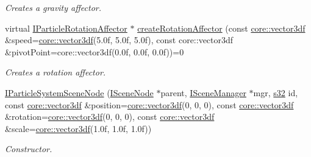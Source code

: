 \begin{DoxyCompactItemize}
\begin{DoxyCompactList}\small\item\em Creates a gravity affector. \end{DoxyCompactList}\item 
virtual \hyperlink{classirr_1_1scene_1_1IParticleRotationAffector}{I\+Particle\+Rotation\+Affector} $\ast$ \hyperlink{classirr_1_1scene_1_1IParticleSystemSceneNode_a7a09b7ebc0d4a2d164233c42689623d6}{create\+Rotation\+Affector} (const \hyperlink{namespaceirr_1_1core_ae6e2b2a6c552833ebbd5b7463d03586b}{core\+::vector3df} \&speed=\hyperlink{namespaceirr_1_1core_ae6e2b2a6c552833ebbd5b7463d03586b}{core\+::vector3df}(5.\+0f, 5.\+0f, 5.\+0f), const core\+::vector3df \&pivot\+Point=core\+::vector3df(0.\+0f, 0.\+0f, 0.\+0f))=0
\begin{DoxyCompactList}\small\item\em Creates a rotation affector. \end{DoxyCompactList}\item 
\mbox{\label{classirr_1_1scene_1_1IParticleSystemSceneNode_a41c24f2388af5451d23f25c79b95295a}} 
\hyperlink{classirr_1_1scene_1_1IParticleSystemSceneNode_a41c24f2388af5451d23f25c79b95295a}{I\+Particle\+System\+Scene\+Node} (\hyperlink{classirr_1_1scene_1_1ISceneNode}{I\+Scene\+Node} $\ast$parent, \hyperlink{classirr_1_1scene_1_1ISceneManager}{I\+Scene\+Manager} $\ast$mgr, \hyperlink{namespaceirr_ac66849b7a6ed16e30ebede579f9b47c6}{s32} id, const \hyperlink{namespaceirr_1_1core_ae6e2b2a6c552833ebbd5b7463d03586b}{core\+::vector3df} \&position=\hyperlink{namespaceirr_1_1core_ae6e2b2a6c552833ebbd5b7463d03586b}{core\+::vector3df}(0, 0, 0), const \hyperlink{namespaceirr_1_1core_ae6e2b2a6c552833ebbd5b7463d03586b}{core\+::vector3df} \&rotation=\hyperlink{namespaceirr_1_1core_ae6e2b2a6c552833ebbd5b7463d03586b}{core\+::vector3df}(0, 0, 0), const \hyperlink{namespaceirr_1_1core_ae6e2b2a6c552833ebbd5b7463d03586b}{core\+::vector3df} \&scale=\hyperlink{namespaceirr_1_1core_ae6e2b2a6c552833ebbd5b7463d03586b}{core\+::vector3df}(1.\+0f, 1.\+0f, 1.\+0f))
\begin{DoxyCompactList}\small\item\em Constructor. \end{DoxyCompactList}\item 
\mbox{\label{classirr_1_1scene_1_1IParticleSystemSceneNode_a17e1abe0feb0b57e96bf49d984bcbb86}} 

\end{DoxyCompactItemize}

